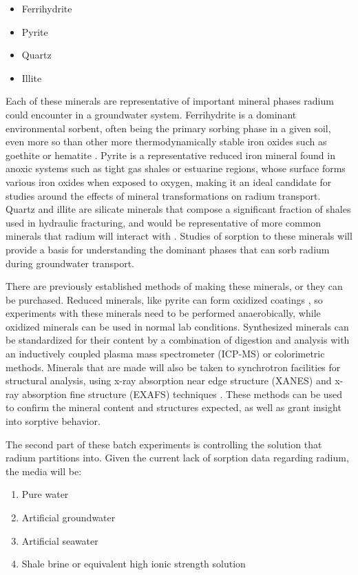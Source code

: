 \documentclass[twoside,12pt,titlepage]{article}
\begin{document}
\begin{itemize}
	\item Ferrihydrite
	\item Pyrite
	\item Quartz
	\item Illite
\end{itemize}

\par Each of these minerals are representative of important mineral phases radium could encounter in a groundwater system. Ferrihydrite is a dominant environmental sorbent, often being the primary sorbing phase in a given soil, even more so than other more thermodynamically stable iron oxides such as goethite or hematite \cite{Michel2007}. Pyrite is a representative reduced iron mineral found in anoxic systems such as tight gas shales or estuarine regions, whose surface forms various iron oxides when exposed to oxygen, making it an ideal candidate for studies around the effects of mineral transformations on radium transport. Quartz and illite are silicate minerals that compose a significant fraction of shales used in hydraulic fracturing, and would be representative of more common minerals that radium will interact with \cite{Chermak2014}. Studies of sorption to these minerals will provide a basis for understanding the dominant phases that can sorb radium during groundwater transport.
\par There are previously established methods of making these minerals, or they can be purchased. Reduced minerals, like pyrite can form oxidized coatings \cite{Buckley1987}, so experiments with these minerals need to be performed anaerobically, while oxidized minerals can be used in normal lab conditions. Synthesized minerals can be standardized for their content by a combination of digestion and analysis with an inductively coupled plasma mass spectrometer (ICP-MS) or colorimetric methods. Minerals that are made will also be taken to synchrotron facilities for structural analysis, using x-ray absorption near edge structure (XANES) and x-ray absorption fine structure (EXAFS) techniques \cite{Fendorf1999}. These methods can be used to confirm the mineral content and structures expected, as well as grant insight into sorptive behavior.
\par The second part of these batch experiments is controlling the solution that radium partitions into. Given the current lack of sorption data regarding radium, the media will be:

\begin{enumerate}[label = \roman*)]
	\item Pure water
	\item Artificial groundwater
	\item Artificial seawater
	\item Shale brine or equivalent high ionic strength solution
\end{enumerate}
\end{document}
